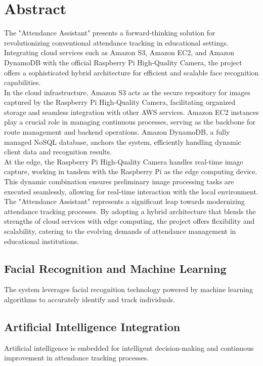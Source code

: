 \documentclass[11pt]{article}
\begin{document}
\tableofcontents
\thispagestyle{empty}
\clearpage

\setcounter{page}{1}

\section{Abstract}
The "Attendance Assistant" presents a forward-thinking solution for revolutionizing conventional attendance tracking in educational settings. Integrating cloud services such as Amazon S3, Amazon EC2, and Amazon DynamoDB with the official Raspberry Pi High-Quality Camera, the project offers a sophisticated hybrid architecture for efficient and scalable face recognition capabilities.\\

In the cloud infrastructure, Amazon S3 acts as the secure repository for images captured by the Raspberry Pi High-Quality Camera, facilitating organized storage and seamless integration with other AWS services. Amazon EC2 instances play a crucial role in managing continuous processes, serving as the backbone for route management and backend operations. Amazon DynamoDB, a fully managed NoSQL database, anchors the system, efficiently handling dynamic client data and recognition results.\\

At the edge, the Raspberry Pi High-Quality Camera handles real-time image capture, working in tandem with the Raspberry Pi as the edge computing device. This dynamic combination ensures preliminary image processing tasks are executed seamlessly, allowing for real-time interaction with the local environment.\\

The "Attendance Assistant" represents a significant leap towards modernizing attendance tracking processes. By adopting a hybrid architecture that blends the strengths of cloud services with edge computing, the project offers flexibility and scalability, catering to the evolving demands of attendance management in educational institutions.
\subsection{Facial Recognition and Machine Learning}
The system leverages facial recognition technology powered by machine learning algorithms to accurately identify and track individuals.

\subsection{Artificial Intelligence Integration}
Artificial intelligence is embedded for intelligent decision-making and continuous improvement in attendance tracking processes.
\end{document}
